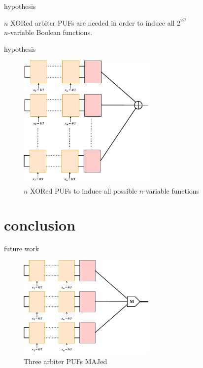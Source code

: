 \documentclass[10pt, compress]{beamer}
\begin{document}
\begin{frame}{hypothesis}
    \begin{center}
        $n$ XORed arbiter PUFs are needed in order to induce all ${2^2}^n$\\$n$-variable Boolean functions.
    \end{center}
\end{frame}




\begin{frame}{hypothesis}
    \begin{figure}
        \centering
        \includegraphics[width=0.6\textwidth]{figures/puf_n_xor.pdf}
        \caption{$n$ XORed PUFs to induce all possible $n$-variable functions}
    \end{figure}
\end{frame}

\section{conclusion}

\begin{frame}{future work}
    \begin{figure}
        \centering
        \includegraphics[width=0.6\textwidth]{figures/puf_3_maj.pdf}
        \caption{Three arbiter PUFs MAJed}
    \end{figure}
\end{frame}
\end{document}
